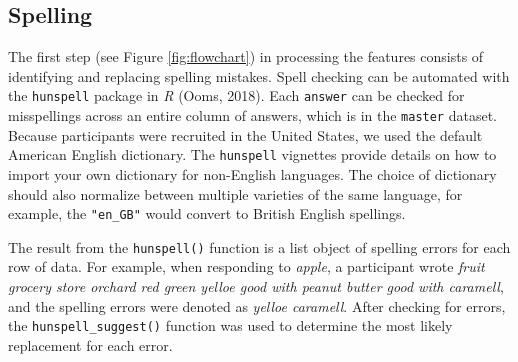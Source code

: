\documentclass[man]{apa6}
\newenvironment{Shaded}{\begin{snugshade}}{\end{snugshade}}
\newcommand{\CommentTok}[1]{\textcolor[rgb]{0.56,0.35,0.01}{\textit{#1}}}
\newcommand{\DataTypeTok}[1]{\textcolor[rgb]{0.13,0.29,0.53}{#1}}
\newcommand{\KeywordTok}[1]{\textcolor[rgb]{0.13,0.29,0.53}{\textbf{#1}}}
\newcommand{\NormalTok}[1]{#1}
\newcommand{\OperatorTok}[1]{\textcolor[rgb]{0.81,0.36,0.00}{\textbf{#1}}}
\newcommand{\StringTok}[1]{\textcolor[rgb]{0.31,0.60,0.02}{#1}}
\begin{document}
\hypertarget{spelling}{%
\subsection{Spelling}\label{spelling}}

The first step (see Figure \ref{fig:flowchart}) in processing the features consists of identifying and replacing spelling mistakes. Spell checking can be automated with the \texttt{hunspell} package in \emph{R} (Ooms, 2018). Each \texttt{answer} can be checked for misspellings across an entire column of answers, which is in the \texttt{master} dataset. Because participants were recruited in the United States, we used the default American English dictionary. The \texttt{hunspell} vignettes provide details on how to import your own dictionary for non-English languages. The choice of dictionary should also normalize between multiple varieties of the same language, for example, the \texttt{"en\_GB"} would convert to British English spellings.

\scriptsize

\begin{Shaded}
\end{Shaded}

\normalsize

The result from the \texttt{hunspell()} function is a list object of spelling errors for each row of data. For example, when responding to \emph{apple}, a participant wrote \emph{fruit grocery store orchard red green yelloe good with peanut butter good with caramell}, and the spelling errors were denoted as \emph{yelloe caramell}. After checking for errors, the \texttt{hunspell\_suggest()} function was used to determine the most likely replacement for each error.

\scriptsize
\end{document}
